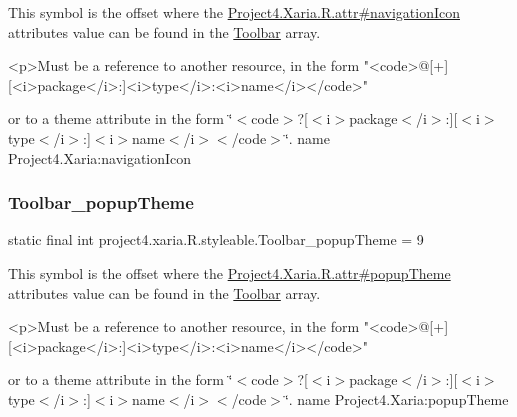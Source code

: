 This symbol is the offset where the \hyperlink{}{Project4.\+Xaria.\+R.\+attr\#navigation\+Icon} attribute\textquotesingle{}s value can be found in the \hyperlink{classproject4_1_1xaria_1_1R_1_1styleable_af6c30f9e9e086f6bf4e510669443fa59}{Toolbar} array.

\begin{DoxyVerb}      <p>Must be a reference to another resource, in the form "<code>@[+][<i>package</i>:]<i>type</i>:<i>name</i></code>"
\end{DoxyVerb}
 or to a theme attribute in the form \char`\"{}$<$code$>$?\mbox{[}$<$i$>$package$<$/i$>$\+:\mbox{]}\mbox{[}$<$i$>$type$<$/i$>$\+:\mbox{]}$<$i$>$name$<$/i$>$$<$/code$>$\char`\"{}.  name Project4.\+Xaria\+:navigation\+Icon \mbox{\label{classproject4_1_1xaria_1_1R_1_1styleable_ad04ed82b66818e311f872c158b0d6df5}} 
\subsubsection{\texorpdfstring{Toolbar\+\_\+popup\+Theme}{Toolbar\_popupTheme}}
{\footnotesize\ttfamily static final int project4.\+xaria.\+R.\+styleable.\+Toolbar\+\_\+popup\+Theme = 9\hspace{0.3cm}{\ttfamily [static]}}

This symbol is the offset where the \hyperlink{}{Project4.\+Xaria.\+R.\+attr\#popup\+Theme} attribute\textquotesingle{}s value can be found in the \hyperlink{classproject4_1_1xaria_1_1R_1_1styleable_af6c30f9e9e086f6bf4e510669443fa59}{Toolbar} array.

\begin{DoxyVerb}      <p>Must be a reference to another resource, in the form "<code>@[+][<i>package</i>:]<i>type</i>:<i>name</i></code>"
\end{DoxyVerb}
 or to a theme attribute in the form \char`\"{}$<$code$>$?\mbox{[}$<$i$>$package$<$/i$>$\+:\mbox{]}\mbox{[}$<$i$>$type$<$/i$>$\+:\mbox{]}$<$i$>$name$<$/i$>$$<$/code$>$\char`\"{}.  name Project4.\+Xaria\+:popup\+Theme \mbox{\label{classproject4_1_1xaria_1_1R_1_1styleable_ab72a989ed660ee062ccf0405ae356a90}} 
